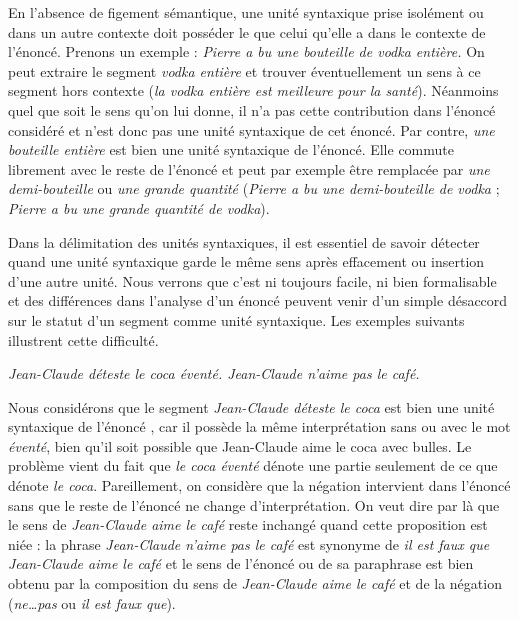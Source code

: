 En l’absence de figement sémantique, une unité syntaxique prise isolément ou dans un autre contexte doit posséder le  que celui qu’elle a dans le contexte de l’énoncé. Prenons un exemple : \textit{Pierre a bu une bouteille de vodka entière.} On peut extraire le segment \textit{vodka entière} et trouver éventuellement un sens à ce segment hors contexte (\textit{la vodka entière est meilleure pour la santé}). Néanmoins quel que soit le sens qu’on lui donne, il n’a pas cette contribution dans l’énoncé considéré et n’est donc pas une unité syntaxique de cet énoncé. Par contre, \textit{une bouteille entière} est bien une unité syntaxique de l’énoncé. Elle commute librement avec le reste de l’énoncé et peut par exemple être remplacée par \textit{une demi-bouteille} ou \textit{une grande quantité} (\textit{Pierre a bu une demi-bouteille de vodka} ; \textit{Pierre a bu une grande quantité de vodka}).

Dans la délimitation des unités syntaxiques, il est essentiel de savoir détecter quand une unité syntaxique garde le même sens après effacement ou insertion d’une autre unité. Nous verrons que c’est ni toujours facile, ni bien formalisable et des différences dans l’analyse d’un énoncé peuvent venir d’un simple désaccord sur le statut d’un segment comme unité syntaxique. Les exemples suivants illustrent cette difficulté.

\ea%
    \label{ex:coca}
     \itshape     {Jean-Claude}  {déteste}  {le}  {coca}  {éventé.}
\ex%
    \label{ex:cafe}
     \itshape     {Jean-Claude}  {n’aime}  {pas}  {le}  {café.}
\z

Nous considérons que le segment \textit{Jean-Claude déteste le coca} est bien une unité syntaxique de l’énoncé , car il possède la même interprétation sans ou avec le mot \textit{éventé}, bien qu’il soit possible que Jean-Claude aime le coca avec bulles. Le problème vient du fait que \textit{le coca éventé} dénote une partie seulement de ce que dénote \textit{le coca}. Pareillement, on considère que la négation intervient dans l’énoncé  sans que le reste de l’énoncé ne change d’interprétation. On veut dire par là que le sens de \textit{Jean-Claude aime le café} reste inchangé quand cette proposition est niée : la phrase \textit{Jean-Claude n’aime pas le café} est synonyme de \textit{il est faux que Jean-Claude aime le café} et le sens de l’énoncé  ou de sa paraphrase est bien obtenu par la composition du sens de \textit{Jean-Claude aime le café} et de la négation (\textit{ne…pas} ou \textit{il est faux que}).


